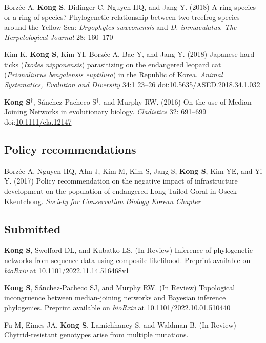 \documentclass[11pt,letterpaper,sans]{moderncv} %
\begin{document}
\begin{etaremune}
	\item Borzée A,\textbf{ Kong S}, Didinger C, Nguyen HQ, and Jang Y. (2018) A ring-species or a ring of species? Phylogenetic relationship between two treefrog species around the Yellow Sea: \textit{Dryophytes suweonensis} and \textit{D. immaculatus}. \textit{The Herpetological Journal} 28: 160–170 
	
	\item Kim K, \textbf{Kong S}, Kim YI, Borzée A, Bae Y, and Jang Y. (2018) Japanese hard ticks (\textit{Ixodes nipponensis}) parasitizing on the endangered leopard cat (\textit{Prionaliurus bengalensis euptilura}) in the Republic of Korea. \textit{Animal Systematics, Evolution and Diversity} 34:1 23–26 doi:\href{https://doi.org/10.5635/ASED.2018.34.1.032}{10.5635/ASED.2018.34.1.032}
	
	\item \textbf{Kong S}{$^\dag$}, Sánchez-Pacheco S{$^\dag$}, and Murphy RW. (2016) On the use of Median-Joining Networks in evolutionary biology. \textit{Cladistics} 32: 691–699 doi:\href{https://doi.org/10.1111/cla.12147}{10.1111/cla.12147}
\end{etaremune}

\subsection{Policy recommendations}
\begin{etaremune}
	\item Borzée A, Nguyen HQ, Ahn J, Kim M, Kim S, Jang S, \textbf{Kong S}, Kim YE, and Yi Y. (2017) Policy recommendation on the negative impact of infrastructure development on the population of endangered Long-Tailed Goral in Oseck-Kkeutchong. \textit{Society for Conservation Biology Korean Chapter}
\end{etaremune}

\subsection{Submitted}
\begin{etaremune}
	\item \textbf{Kong S}, Swofford DL, and Kubatko LS. (In Review) Inference of phylogenetic networks from sequence data using composite likelihood. Preprint available on \textit{bioRxiv} at \href{https://www.biorxiv.org/content/10.1101/2022.11.14.516468v1}{10.1101/2022.11.14.516468v1}%
	\item \textbf{Kong S}, Sánchez-Pacheco SJ, and Murphy RW. (In Review) Topological incongruence between median-joining networks and Bayesian inference phylogenies. Preprint available on \textit{bioRxiv} at \href{https://doi.org/10.1101/2022.10.01.510440}{10.1101/2022.10.01.510440}%
	\item Fu M, Eimes JA, \textbf{Kong S}, Lamichhaney S, and Waldman B. (In Review) Chytrid-resistant genotypes arise from multiple mutations. 	
\end{etaremune}
\end{document}
